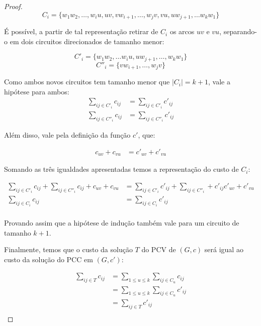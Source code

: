\begin{proof}
            \[
                C_i = \{ w_1w_2, \dots, w_iu, uv, vw_{i+1}, \dots, w_jv,  vu, uw_{j+1}, \dots w_kw_1\}
            \]

            É possível, a partir de tal representação retirar de $C_i$ os arcos $uv$ e $vu$, separando-o em dois circuitos direcionados de tamanho menor:

            \[
                C'_i = \{w_1w_2, \dots w_iu, uw_{j+1}, \dots, w_kw_1\} 
            \]
            \[
                C''_i = \{vw_{i+1}, \dots, w_jv\}
            \]

            Como ambos novos circuitos tem tamanho menor que $|C_i| = k+1$, vale a hipótese para ambos:
            \begin{align}
                \sum_{ij \in C'_i} c_{ij} &= \sum_{ij \in C'_i} c'_{ij} \\
                \sum_{ij \in C''_i} c_{ij} &= \sum_{ij \in C''_i} c'_{ij}
            \end{align}
            
            Além disso, vale pela definição da função $c'$, que:
            
            \begin{align}
                c_{uv} + c_{vu}  &= c'_{uv} + c'_{vu} 
            \end{align}

            Somando as três igualdades apresentadas temos a representação do custo de $C_i$:

            \begin{align*}
                \sum_{ij \in C'_i} c_{ij} +  \sum_{ij \in C''_i} c_{ij} + c_{uv} + c_{vu}  &= \sum_{ij \in C'_i} c'_{ij} + \sum_{ij \in C''_i} + c'_{ij} c'_{uv} + c'_{vu}  \\
                \sum_{ij \in C_i} c_{ij} &= \sum_{ij \in C_i} c'_{ij} \\
            \end{align*}
             
            Provando assim que a hipótese de indução também vale para um circuito de tamanho $k+1$.

            Finalmente, temos que o custo da solução $T$ do PCV de $(G, c)$ será igual ao custo da solução do PCC em $(G, c')$:

            \begin{align*}
                \sum_{ij \in T} c_{ij} &= \sum_{1 \leq u \leq k} \sum_{ij \in C_u} c_{ij} \\
                                       &= \sum_{1 \leq u \leq k} \sum_{ij \in C_u} c'_{ij} \\
                                       &= \sum_{ij \in T} c'_{ij} \\
            \end{align*}



\end{proof}
